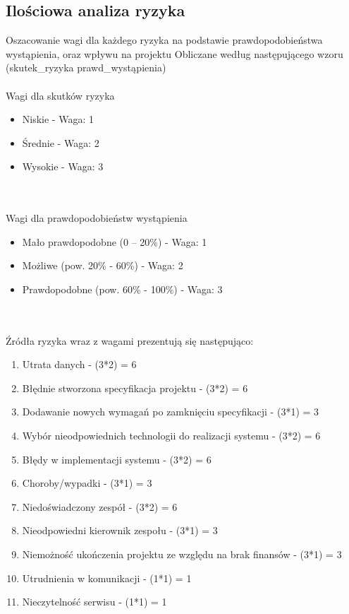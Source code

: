 \documentclass{article}
\begin{document}
\subsection{Ilościowa analiza ryzyka}
Oszacowanie wagi dla każdego ryzyka na podstawie prawdopodobieństwa wystąpienia, oraz wpływu na projektu
Obliczane według następującego wzoru (skutek\_ryzyka \* prawd\_wystąpienia)
\mbox{}\\\mbox{}\\
Wagi dla skutków ryzyka
\begin{itemize}
\item{Niskie     - Waga: 1}
\item{Średnie    - Waga: 2}
\item{Wysokie	 - Waga: 3}
\end{itemize}
\mbox{}\\
\mbox{}\\
Wagi dla prawdopodobieństw wystąpienia
\begin{itemize}
\item{Mało prawdopodobne (0 – 20\%) - Waga: 1}
\item{Możliwe (pow. 20\% - 60\%) - Waga: 2}
\item{Prawdopodobne (pow. 60\% - 100\%) - Waga: 3}
\end{itemize}
\mbox{}\\ \mbox{}\\
Źródła ryzyka wraz z wagami prezentują się następująco:
\begin{enumerate}
\item{Utrata danych - (3*2) = 6}
\item{Błędnie stworzona specyfikacja projektu - (3*2) = 6}
\item{Dodawanie nowych wymagań po zamknięciu specyfikacji - (3*1) = 3}
\item{Wybór nieodpowiednich technologii do realizacji systemu - (3*2) = 6}
\item{Błędy w implementacji systemu - (3*2) = 6}
\item{Choroby/wypadki - (3*1) = 3}
\item{Niedoświadczony zespół - (3*2) = 6}
\item{Nieodpowiedni kierownik zespołu - (3*1) = 3}
\item{Niemożność ukończenia projektu ze względu na brak finansów - (3*1) = 3}
\item{Utrudnienia w komunikacji - (1*1) = 1}
\item{Nieczytelność serwisu - (1*1) = 1}
\end{enumerate}
\mbox{}\\ \mbox{}\\\mbox{}\\\mbox{}\\\mbox{}\\\mbox{}\\\mbox{}\\ \mbox{}\\ 
\end{document}
